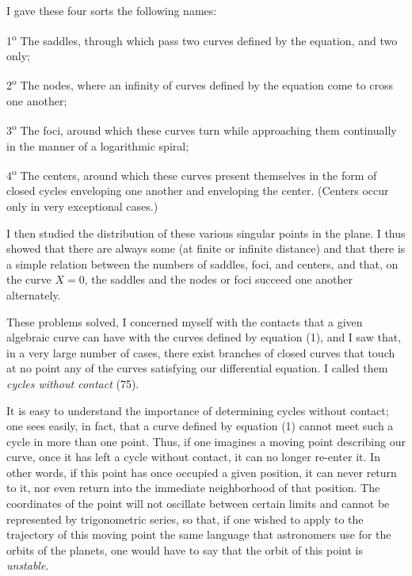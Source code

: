 \documentclass[11pt]{article}
\begin{document}
I gave these four sorts the following names:

1\textsuperscript{o} The saddles, through which pass two curves defined by the equation, and two only;

2\textsuperscript{o} The nodes, where an infinity of curves defined by the equation come to cross one another;

3\textsuperscript{o} The foci, around which these curves turn while approaching them continually in the manner of a logarithmic spiral;

4\textsuperscript{o} The centers, around which these curves present themselves in the form of closed cycles enveloping one another and enveloping the center. (Centers occur only in very exceptional cases.)

I then studied the distribution of these various singular points in the plane. I thus showed that there are always some (at finite or infinite distance) and that there is a simple relation between the numbers of saddles, foci, and centers, and that, on the curve $X=0$, the saddles and the nodes or foci succeed one another alternately.

These problems solved, I concerned myself with the contacts that a given algebraic curve can have with the curves defined by equation (1), and I saw that, in a very large number of cases, there exist branches of closed curves that touch at no point any of the curves satisfying our differential equation. I called them \emph{cycles without contact} (75).

It is easy to understand the importance of determining cycles without contact; one sees easily, in fact, that a curve defined by equation (1) cannot meet such a cycle in more than one point. Thus, if one imagines a moving point describing our curve, once it has left a cycle without contact, it can no longer re-enter it. In other words, if this point has once occupied a given position, it can never return to it, nor even return into the immediate neighborhood of that position. The coordinates of the point will not oscillate between certain limits and cannot be represented by trigonometric series, so that, if one wished to apply to the trajectory of this moving point the same language that astronomers use for the orbits of the planets, one would have to say that the orbit of this point is \emph{unstable}.
\end{document}
